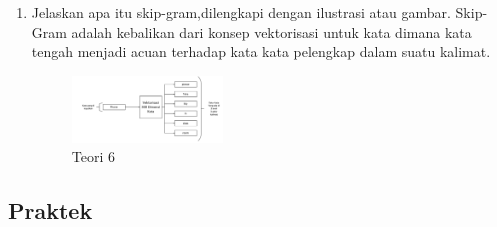 \begin{enumerate}
	\item Jelaskan apa itu skip-gram,dilengkapi dengan ilustrasi atau gambar.
	\hfill\break
	Skip-Gram adalah kebalikan dari konsep vektorisasi untuk kata dimana kata tengah menjadi acuan terhadap kata kata pelengkap dalam suatu kalimat.
	\hfill\break
	\begin{figure}[H]
		\includegraphics[width=4cm]{figures/1174086/5/6.PNG}
		\centering
		\caption{Teori 6}
	\end{figure}
\end{enumerate}

\subsection{Praktek}
